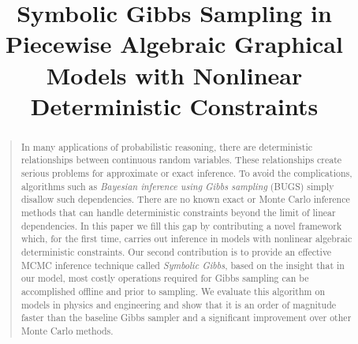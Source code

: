 \documentclass[letterpaper]{article}
\begin{document}
\title{Symbolic Gibbs Sampling in Piecewise Algebraic Graphical Models with Nonlinear Deterministic Constraints}
\author{
}


\maketitle

\begin{abstract}
\begin{quote}
In many applications of probabilistic reasoning, there are deterministic relationships between
continuous random variables. These relationships create serious problems for approximate or exact inference.
To avoid the complications, algorithms such as \emph{Bayesian inference using Gibbs sampling} (BUGS) simply disallow such dependencies.  
There are no known exact or Monte Carlo inference methods that can handle deterministic constraints beyond the limit of linear dependencies.
In this paper we fill this gap by contributing a novel framework which,
for the first time, carries out inference in models with nonlinear algebraic deterministic constraints. %
Our second contribution is to provide an effective MCMC inference technique called \emph{Symbolic Gibbs}, based on the insight that in our model, most costly operations required for Gibbs sampling can be accomplished offline and prior to sampling. 
We evaluate this algorithm on models in physics and engineering and show that it is an order of magnitude faster than the baseline Gibbs sampler and a significant improvement over other Monte Carlo methods.  
\end{quote}
\end{abstract}
\end{document}
